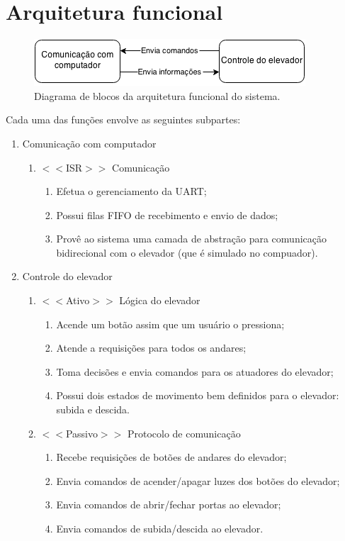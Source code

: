 \chapter{Arquitetura funcional}


\begin{figure}[h]
    \centering
    \includegraphics[width=0.8\columnwidth]{./figures/arq_funcional.png}
    \caption{Diagrama de blocos da arquitetura funcional do sistema.}
    \label{fig:arq_funcional}
\end{figure}


Cada uma das funções envolve as seguintes subpartes:

\begin{enumerate}
	\item Comunicação com computador
	\begin{enumerate}
		\item $<<$ISR$>>$ Comunicação
		\begin{enumerate}
			\item Efetua o gerenciamento da UART;
			\item Possui filas FIFO de recebimento e envio de dados;
			\item Provê ao sistema uma camada de abstração para comunicação bidirecional com o elevador (que é simulado no compuador).
		\end{enumerate}
	\end{enumerate}
	
	\item Controle do elevador
	\begin{enumerate}
		\item $<<$Ativo$>>$ Lógica do elevador
		\begin{enumerate}
			\item Acende um botão assim que um usuário o pressiona;
			\item Atende a requisições para todos os andares;
			\item Toma decisões e envia comandos para os atuadores do elevador;
			\item Possui dois estados de movimento bem definidos para o elevador: subida e descida.
		\end{enumerate}
		\item $<<$Passivo$>>$ Protocolo de comunicação
		\begin{enumerate}
			\item Recebe requisições de botões de andares do elevador;
			\item Envia comandos de acender/apagar luzes dos botões do elevador;
			\item Envia comandos de abrir/fechar portas ao elevador;
			\item Envia comandos de subida/descida ao elevador.
		\end{enumerate}
	\end{enumerate}
\end{enumerate}


